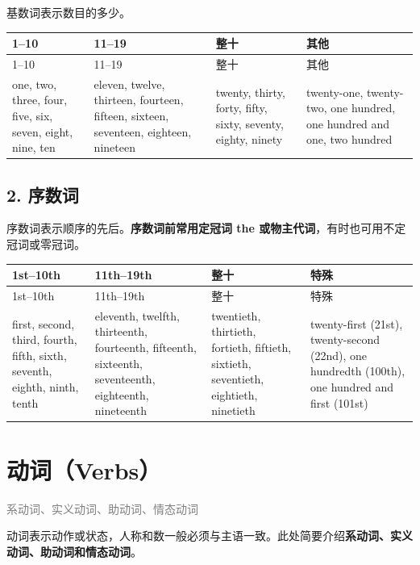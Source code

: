\documentclass[11pt,a4paper]{ctexart}
\begin{document}
基数词表示数目的多少。

{\footnotesize
\begin{longtable}{p{3.35cm}p{3.35cm}p{3.35cm}p{3.35cm}}
\hline
1–10 & 11–19 & 整十 & 其他 \\
\hline
\endfirsthead
\hline
1–10 & 11–19 & 整十 & 其他 \\
\hline
\endhead
\hline
\endfoot
one, two, three, four, five, six, seven, eight, nine, ten & eleven, twelve, thirteen, fourteen, fifteen, sixteen, seventeen, eighteen, nineteen & twenty, thirty, forty, fifty, sixty, seventy, eighty, ninety & twenty-one, twenty-two, one hundred, one hundred and one, two hundred \\
\end{longtable}
}

\subsection*{2. 序数词}

序数词表示顺序的先后。\textbf{序数词前常用定冠词 the 或物主代词}，有时也可用不定冠词或零冠词。

{\footnotesize
\begin{longtable}{p{3.35cm}p{3.35cm}p{3.35cm}p{3.35cm}}
\hline
1st–10th & 11th–19th & 整十 & 特殊 \\
\hline
\endfirsthead
\hline
1st–10th & 11th–19th & 整十 & 特殊 \\
\hline
\endhead
\hline
\endfoot
first, second, third, fourth, fifth, sixth, seventh, eighth, ninth, tenth & eleventh, twelfth, thirteenth, fourteenth, fifteenth, sixteenth, seventeenth, eighteenth, nineteenth & twentieth, thirtieth, fortieth, fiftieth, sixtieth, seventieth, eightieth, ninetieth & twenty-first (21st), twenty-second (22nd), one hundredth (100th), one hundred and first (101st) \\
\end{longtable}
}

\begin{center}\end{center}

\section{动词（Verbs）}
\noindent\textcolor{gray}{系动词、实义动词、助动词、情态动词}\par\smallskip
动词表示动作或状态，人称和数一般必须与主语一致。此处简要介绍\textbf{系动词、实义动词、助动词和情态动词}。
\end{document}
